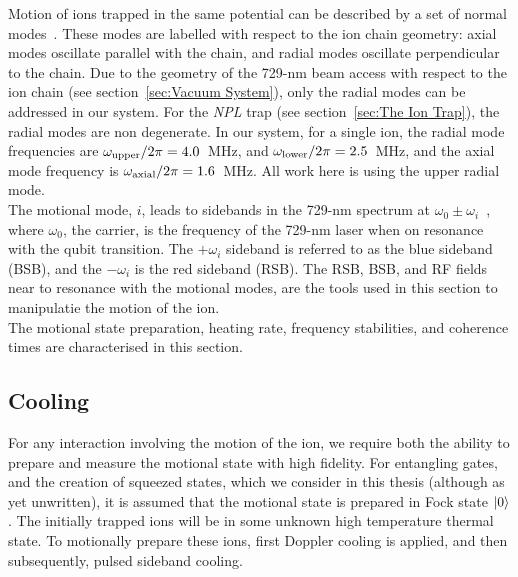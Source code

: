     Motion of ions trapped in the same potential can be described by a set of normal modes~\cite{james_quantum_1998}. These modes are labelled with respect to the ion chain geometry: axial modes oscillate parallel with the chain, and radial modes oscillate perpendicular to the chain. Due to the geometry of the 729-nm beam access with respect to the ion chain (see section~\ref{sec:Vacuum System}), only the radial modes can be addressed in our system. For the \emph{NPL} trap (see section~\ref{sec:The Ion Trap}), the radial modes are non degenerate. In our system, for a single ion, the radial mode frequencies are $\omega_{\rm upper}/2\pi = 4.0$~\unit{\MHz}, and $\omega_{\rm lower}/2\pi = 2.5$~\unit{\MHz}, and the axial mode frequency is $\omega_{\rm axial}/2\pi = 1.6$~\unit{\MHz}. All work here is using the upper radial mode. \\
    The motional mode, $i$, leads to sidebands in the 729-nm spectrum at $\omega_0 \pm \omega_{i}$~\cite{ozeri_tutorial_2011}, where $\omega_0$, the carrier, is the frequency of the 729-nm laser when on resonance with the qubit transition. The $+\omega_i$ sideband is referred to as the blue sideband (BSB), and the $-\omega_i$ is the red sideband (RSB).
    The RSB, BSB, and RF fields near to resonance with the motional modes, are the tools used in this section to manipulatie the motion of the ion.\\
    The motional state preparation, heating rate, frequency stabilities, and coherence times are characterised in this section.

\subsection{Cooling}
\label{sec:Cooling}

    For any interaction involving the motion of the ion, we require both the
    ability to prepare and measure the motional state with high fidelity. For
    entangling gates, and the creation of squeezed states, which we 
    consider in this thesis (although as yet unwritten), it is assumed that the motional state is prepared in Fock state $\ket{0}$. The initially trapped ions will
    be in some unknown high temperature thermal state. To motionally prepare these ions, first Doppler cooling is applied, and then
    subsequently, pulsed sideband cooling. \\

